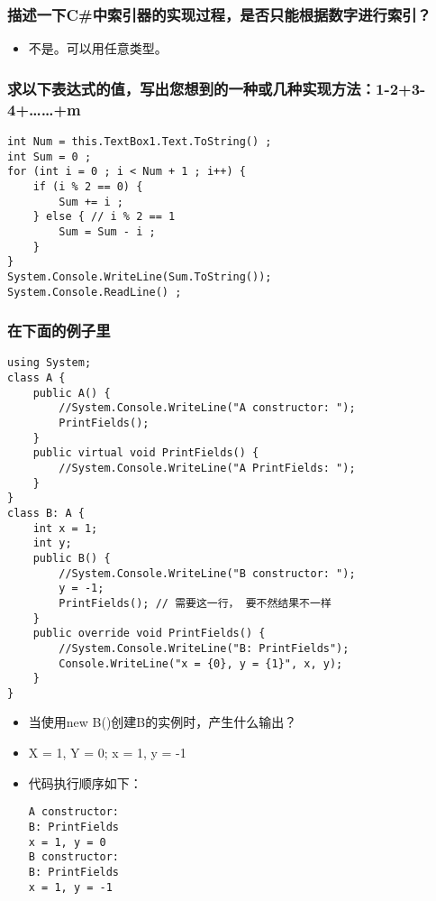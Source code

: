 \documentclass[9pt, b5paper]{article}
\begin{document}
\subsubsection{描述一下C\#中索引器的实现过程，是否只能根据数字进行索引？}
\label{sec-1-1-10}
\begin{itemize}
\item 不是。可以用任意类型。
\end{itemize}
\subsubsection{求以下表达式的值，写出您想到的一种或几种实现方法：1-2+3-4+……+m}
\label{sec-1-1-11}
\begin{verbatim}
int Num = this.TextBox1.Text.ToString() ;
int Sum = 0 ;
for (int i = 0 ; i < Num + 1 ; i++) {
    if (i % 2 == 0) {
        Sum += i ;
    } else { // i % 2 == 1
        Sum = Sum - i ;
    }
}
System.Console.WriteLine(Sum.ToString());
System.Console.ReadLine() ;
\end{verbatim}
\subsubsection{在下面的例子里}
\label{sec-1-1-12}
\begin{verbatim}
using System;
class A {
    public A() {
        //System.Console.WriteLine("A constructor: ");
        PrintFields();
    }
    public virtual void PrintFields() {
        //System.Console.WriteLine("A PrintFields: ");
    }
}
class B: A {
    int x = 1;
    int y;
    public B() {
        //System.Console.WriteLine("B constructor: ");
        y = -1;
        PrintFields(); // 需要这一行， 要不然结果不一样
    }
    public override void PrintFields() {
        //System.Console.WriteLine("B: PrintFields");
        Console.WriteLine("x = {0}, y = {1}", x, y);
    }
}
\end{verbatim}
\begin{itemize}
\item 当使用new B()创建B的实例时，产生什么输出？
\item X = 1, Y = 0; x =  1, y = -1
\item 代码执行顺序如下：

\begin{verbatim}
A constructor: 
B: PrintFields
x = 1, y = 0
B constructor: 
B: PrintFields
x = 1, y = -1
\end{verbatim}
\end{itemize}
\end{document}
